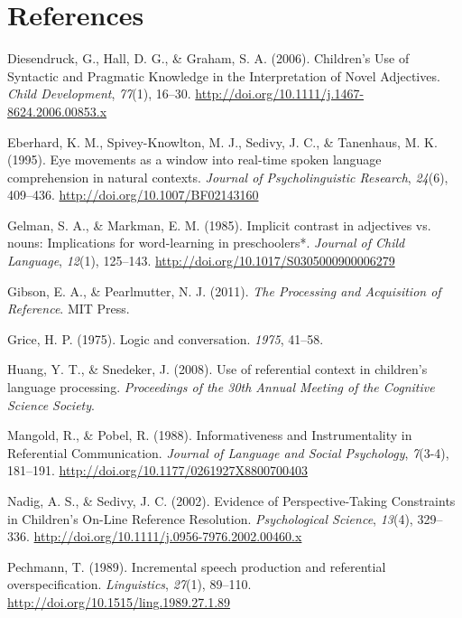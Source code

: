 \documentclass[10pt, letterpaper]{article}
\begin{document}
\section*{References}\label{references}

\hypertarget{refs}{}
\hypertarget{ref-diesendruck_childrens_2006}{}
Diesendruck, G., Hall, D. G., \& Graham, S. A. (2006). Children's Use of
Syntactic and Pragmatic Knowledge in the Interpretation of Novel
Adjectives. \emph{Child Development}, \emph{77}(1), 16--30.
\url{http://doi.org/10.1111/j.1467-8624.2006.00853.x}

\hypertarget{ref-eberhard_eye_1995}{}
Eberhard, K. M., Spivey-Knowlton, M. J., Sedivy, J. C., \& Tanenhaus, M.
K. (1995). Eye movements as a window into real-time spoken language
comprehension in natural contexts. \emph{Journal of Psycholinguistic
Research}, \emph{24}(6), 409--436.
\url{http://doi.org/10.1007/BF02143160}

\hypertarget{ref-gelman_implicit_1985}{}
Gelman, S. A., \& Markman, E. M. (1985). Implicit contrast in adjectives
vs. nouns: Implications for word-learning in preschoolers*.
\emph{Journal of Child Language}, \emph{12}(1), 125--143.
\url{http://doi.org/10.1017/S0305000900006279}

\hypertarget{ref-gibson_processing_2011}{}
Gibson, E. A., \& Pearlmutter, N. J. (2011). \emph{The Processing and
Acquisition of Reference}. MIT Press.

\hypertarget{ref-grice1975logic}{}
Grice, H. P. (1975). Logic and conversation. \emph{1975}, 41--58.

\hypertarget{ref-huangsnedeker2008}{}
Huang, Y. T., \& Snedeker, J. (2008). Use of referential context in
children's language processing. \emph{Proceedings of the 30th Annual
Meeting of the Cognitive Science Society}.

\hypertarget{ref-mangold_informativeness_1988}{}
Mangold, R., \& Pobel, R. (1988). Informativeness and Instrumentality in
Referential Communication. \emph{Journal of Language and Social
Psychology}, \emph{7}(3-4), 181--191.
\url{http://doi.org/10.1177/0261927X8800700403}

\hypertarget{ref-nadig_evidence_2002}{}
Nadig, A. S., \& Sedivy, J. C. (2002). Evidence of Perspective-Taking
Constraints in Children's On-Line Reference Resolution.
\emph{Psychological Science}, \emph{13}(4), 329--336.
\url{http://doi.org/10.1111/j.0956-7976.2002.00460.x}

\hypertarget{ref-pechmann_incremental_1989}{}
Pechmann, T. (1989). Incremental speech production and referential
overspecification. \emph{Linguistics}, \emph{27}(1), 89--110.
\url{http://doi.org/10.1515/ling.1989.27.1.89}
\end{document}
